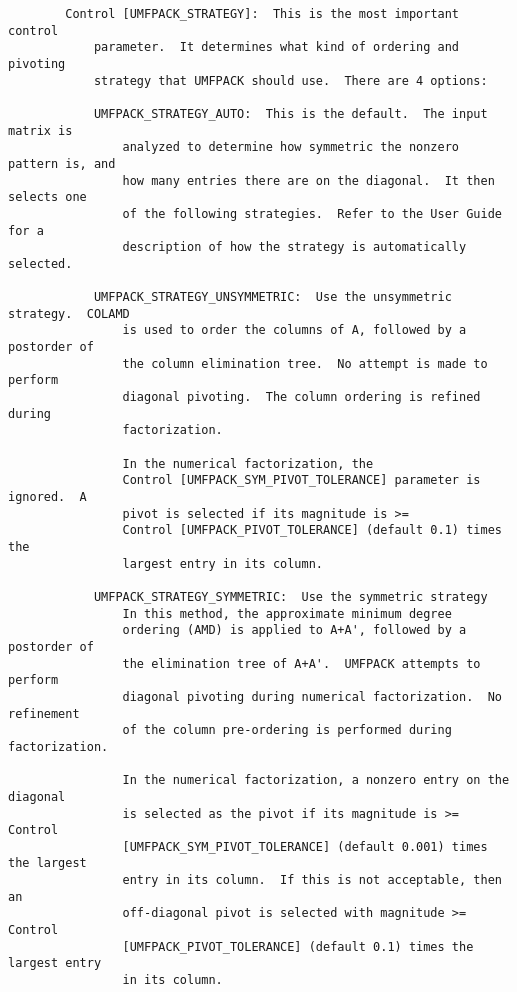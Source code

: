 \documentclass[11pt]{article}
\begin{document}
{\begin{verbatim}
        Control [UMFPACK_STRATEGY]:  This is the most important control
            parameter.  It determines what kind of ordering and pivoting
            strategy that UMFPACK should use.  There are 4 options:

            UMFPACK_STRATEGY_AUTO:  This is the default.  The input matrix is
                analyzed to determine how symmetric the nonzero pattern is, and
                how many entries there are on the diagonal.  It then selects one
                of the following strategies.  Refer to the User Guide for a
                description of how the strategy is automatically selected.

            UMFPACK_STRATEGY_UNSYMMETRIC:  Use the unsymmetric strategy.  COLAMD
                is used to order the columns of A, followed by a postorder of
                the column elimination tree.  No attempt is made to perform
                diagonal pivoting.  The column ordering is refined during
                factorization.

                In the numerical factorization, the
                Control [UMFPACK_SYM_PIVOT_TOLERANCE] parameter is ignored.  A
                pivot is selected if its magnitude is >=
                Control [UMFPACK_PIVOT_TOLERANCE] (default 0.1) times the
                largest entry in its column.

            UMFPACK_STRATEGY_SYMMETRIC:  Use the symmetric strategy
                In this method, the approximate minimum degree
                ordering (AMD) is applied to A+A', followed by a postorder of
                the elimination tree of A+A'.  UMFPACK attempts to perform
                diagonal pivoting during numerical factorization.  No refinement
                of the column pre-ordering is performed during factorization.

                In the numerical factorization, a nonzero entry on the diagonal
                is selected as the pivot if its magnitude is >= Control
                [UMFPACK_SYM_PIVOT_TOLERANCE] (default 0.001) times the largest
                entry in its column.  If this is not acceptable, then an
                off-diagonal pivot is selected with magnitude >= Control
                [UMFPACK_PIVOT_TOLERANCE] (default 0.1) times the largest entry
                in its column.


\end{verbatim}}
\end{document}
